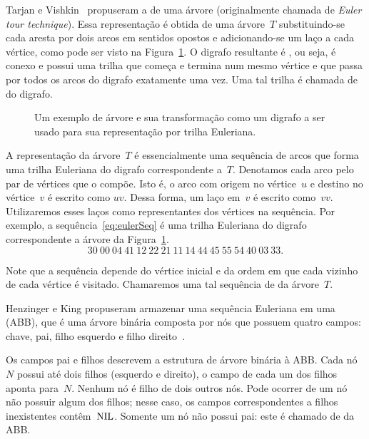 Tarjan e Vishkin~\cite{tarjan1985} propuseram a  de uma árvore (originalmente chamada de \textit{Euler tour technique}).
Essa representação é obtida de uma árvore~$T$ substituindo-se cada aresta por dois arcos em sentidos opostos e adicionando-se um laço a cada vértice, como pode ser visto na Figura~\ref{fig:exemploSeqEuler}. O digrafo resultante é , ou seja, é conexo e possui uma trilha que começa e termina num mesmo vértice e que passa por todos os arcos do digrafo exatamente uma vez. Uma tal trilha é chamada de  do digrafo.


\begin{figure}[htb]
\centering


\caption{Um exemplo de árvore e sua transformação como um digrafo a ser usado para sua representação por trilha Euleriana.}
\label{fig:exemploSeqEuler}
\end{figure}

A representação da árvore~$T$ é essencialmente uma sequência de arcos que forma uma trilha Euleriana do digrafo correspondente a~$T$.
Denotamos cada arco pelo par de vértices que o compõe.
Isto é, o arco com origem no vértice~$u$ e destino no vértice~$v$ é escrito como $uv$.
Dessa forma, um laço em~$v$ é escrito como~$vv$.
Utilizaremos esses laços como representantes dos vértices na sequência. 
Por exemplo, a sequência~\eqref{eq:eulerSeq} é uma trilha Euleriana do digrafo correspondente a árvore da Figura~\ref{fig:exemploSeqEuler}.
\begin{equation}
30~00~04~41~12~22~21~11~14~44~45~55~54~40~03~33.\label{eq:eulerSeq}  
\end{equation}

Note que a sequência depende do vértice inicial e da ordem em que cada vizinho de cada vértice é visitado. Chamaremos uma tal sequência de  da árvore~$T$.

Henzinger e King \cite{HenzingerKing} propuseram armazenar uma sequência Euleriana em uma  (ABB), que é uma árvore binária composta por nós que possuem  quatro campos: chave, pai, filho esquerdo e filho direito~\cite{CLRS}.

Os campos pai e filhos descrevem a estrutura de árvore binária à ABB. Cada nó~$N$ possui até dois filhos (esquerdo e direito), o campo  de cada um dos filhos aponta para~$N$. Nenhum nó é filho de dois outros nós. Pode ocorrer de um nó não possuir algum dos filhos; nesse caso, os campos correspondentes a filhos inexistentes contêm~$\text{NIL}$. Somente um nó não possui pai: este é chamado de  da ABB.

